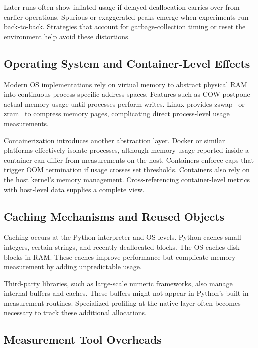 Later runs often show inflated usage if delayed deallocation carries over from earlier operations.
Spurious or exaggerated peaks emerge when experiments run back-to-back.
Strategies that account for garbage-collection timing or reset the environment help avoid these distortions.

\subsection{Operating System and Container-Level Effects}
\label{subsec:appendix-os-effects}

Modern \ac{OS} implementations rely on virtual memory to abstract physical RAM into continuous process-specific address spaces.
Features such as \ac{COW} postpone actual memory usage until processes perform writes.
Linux provides zswap~\cite{zswap} or zram~\cite{zram} to compress memory pages, complicating direct process-level usage measurements.

Containerization introduces another abstraction layer.
Docker or similar platforms effectively isolate processes, although memory usage reported inside a container can differ from measurements on the host.
Containers enforce caps that trigger \ac{OOM} termination if usage crosses set thresholds.
Containers also rely on the host kernel's memory management.
Cross-referencing container-level metrics with host-level data supplies a complete view.

\subsection{Caching Mechanisms and Reused Objects}
\label{subsec:appendix-caching}

Caching occurs at the Python interpreter and \ac{OS} levels.
Python caches small integers, certain strings, and recently deallocated blocks.
The \ac{OS} caches disk blocks in \ac{RAM}.
These caches improve performance but complicate memory measurement by adding unpredictable usage.

Third-party libraries, such as large-scale numeric frameworks, also manage internal buffers and caches.
These buffers might not appear in Python's built-in measurement routines.
Specialized profiling at the native layer often becomes necessary to track these additional allocations.

\subsection{Measurement Tool Overheads}
\label{subsec:appendix-measurement-tool-overheads}

